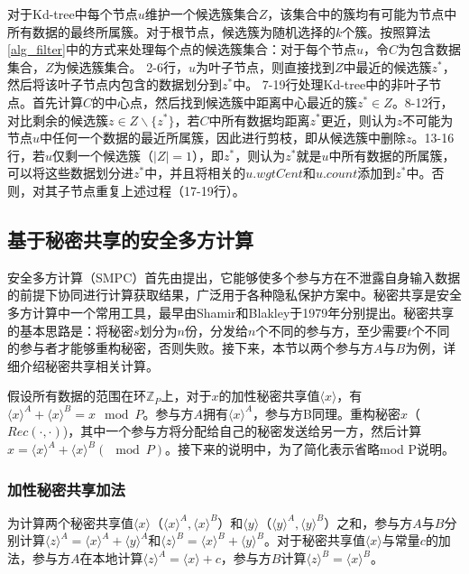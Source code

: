 对于Kd-tree中每个节点$ u $维护一个候选簇集合$ Z $，该集合中的簇均有可能为节点中所有数据的最终所属簇。对于根节点，候选簇为随机选择的$ k $个簇。按照算法\ref{alg_filter}中的方式来处理每个点的候选簇集合：对于每个节点$ u $，令$ C $为包含数据集合，$ Z $为候选簇集合。
2-6行，$ u $为叶子节点，则直接找到$ Z $中最近的候选簇$ z^* $，然后将该叶子节点内包含的数据划分到$ z^* $中。
7-19行处理Kd-tree中的非叶子节点。首先计算$ C $的中心点，然后找到候选簇中距离中心最近的簇$ z^*\in Z $。8-12行，对比剩余的候选簇$ z\in Z\backslash\{z^*\} $，若$ C $中所有数据均距离$ z^* $更近，则认为$ z $不可能为节点$ u $中任何一个数据的最近所属簇，因此进行剪枝，即从候选簇中删除$ z $。13-16行，若$ u $仅剩一个候选簇（$ |Z|=1 $），即$ z^* $，则认为$ z^* $就是$ u $中所有数据的所属簇，可以将这些数据划分进$ z^* $中，并且将相关的$ u.wgtCent $和$ u.count $添加到$ z^* $中。否则，对其子节点重复上述过程（17-19行）。

\subsection{基于秘密共享的安全多方计算}
安全多方计算（SMPC）首先由\cite{yao1986generate}提出，它能够使多个参与方在不泄露自身输入数据的前提下协同进行计算获取结果，广泛用于各种隐私保护方案中。秘密共享是安全多方计算中一个常用工具，最早由Shamir\cite{rivest2001leak}和Blakley\cite{blakley1979safeguarding}于1979年分别提出。秘密共享的基本思路是：将秘密$ s $划分为$ n $份，分发给$ n $个不同的参与方，至少需要$ t $个不同的参与者才能够重构秘密，否则失败。接下来，本节以两个参与方$ A $与$ B $为例，详细介绍秘密共享相关计算。

假设所有数据的范围在环$ \mathbb{Z}_P $上，对于$ x $的加性秘密共享值$ \langle x \rangle $，有$ \langle x \rangle^A + \langle x \rangle^B = x\mod P$。参与方$ A $拥有$ \langle x \rangle^A $，参与方B同理。重构秘密$ x $（$ Rec(\cdot, \cdot) $)，其中一个参与方将分配给自己的秘密发送给另一方，然后计算$ x=\langle x\rangle^A+\langle x\rangle^B(\mod P) $。接下来的说明中，为了简化表示省略mod P说明。

\subsubsection{加性秘密共享加法}
为计算两个秘密共享值$ \langle x \rangle $（$ \langle x \rangle^A,\langle x \rangle^B $）和$ \langle y \rangle $（$ \langle y\rangle^A,\langle y\rangle^B $）之和，参与方$ A $与$ B $分别计算$\langle z\rangle^A=\langle x\rangle^A+\langle y\rangle^A$和$\langle z\rangle^B=\langle x\rangle^B+\langle y\rangle^B$。对于秘密共享值$ \langle x \rangle $与常量$ c $的加法，参与方$ A $在本地计算$\langle z\rangle^A=\langle x\rangle+c$，参与方$ B $计算$\langle z\rangle^B=\langle x\rangle^B$。
